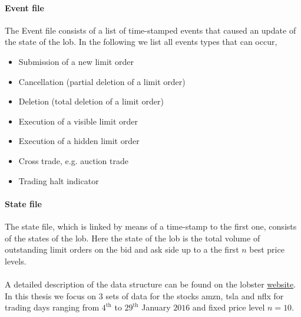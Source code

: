 \documentclass[11pt, a4paper]{thesis}  %
\begin{document}
\paragraph{Event file} The Event file consists of a list of time-stamped events that caused an update of the state of the \ac{lob}. In the following we list all events types that can occur, 
\begin{itemize}
	\item Submission of a new limit order
	\item Cancellation (partial deletion of a limit order)
	\item Deletion (total deletion of a limit order)
	\item Execution of a visible limit order
	\item Execution of a hidden limit order
	\item Cross trade, e.g. auction trade
	\item Trading halt indicator
\end{itemize}

\paragraph{State file} The state file, which is linked by means of a time-stamp to the first one, consists of the states of the \ac{lob}. Here the state of the \ac{lob} is the total volume of outstanding limit orders on the bid and ask side up to a the first $n$ best price levels. 
\\
\\
\noindent A detailed description of the data structure can be found on the \ac{lobster} \href{https://lobsterdata.com/info/DataStructure.php}{website}. 
\\
In this thesis we focus on $3$ sets of data for the stocks \ac{amzn}, \ac{tsla} and \ac{nflx} for trading days ranging from $4^\textrm{th}$ to $29^{\textrm{th}}$  January $2016$ and fixed price level $n=10$. 
\end{document}
